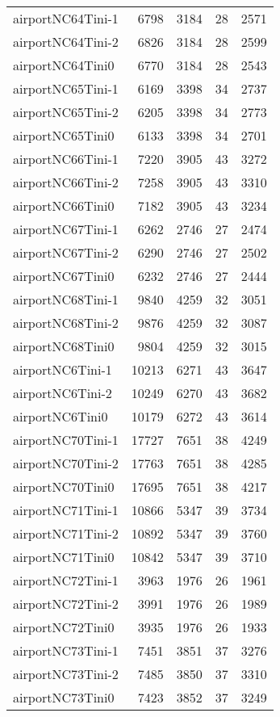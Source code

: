 \begin{longtable}{lrrrr}
airportNC64Tini-1 & 6798 & 3184 & 28 & 2571 \\
airportNC64Tini-2 & 6826 & 3184 & 28 & 2599 \\
airportNC64Tini0 & 6770 & 3184 & 28 & 2543 \\
airportNC65Tini-1 & 6169 & 3398 & 34 & 2737 \\
airportNC65Tini-2 & 6205 & 3398 & 34 & 2773 \\
airportNC65Tini0 & 6133 & 3398 & 34 & 2701 \\
airportNC66Tini-1 & 7220 & 3905 & 43 & 3272 \\
airportNC66Tini-2 & 7258 & 3905 & 43 & 3310 \\
airportNC66Tini0 & 7182 & 3905 & 43 & 3234 \\
airportNC67Tini-1 & 6262 & 2746 & 27 & 2474 \\
airportNC67Tini-2 & 6290 & 2746 & 27 & 2502 \\
airportNC67Tini0 & 6232 & 2746 & 27 & 2444 \\
airportNC68Tini-1 & 9840 & 4259 & 32 & 3051 \\
airportNC68Tini-2 & 9876 & 4259 & 32 & 3087 \\
airportNC68Tini0 & 9804 & 4259 & 32 & 3015 \\
airportNC6Tini-1 & 10213 & 6271 & 43 & 3647 \\
airportNC6Tini-2 & 10249 & 6270 & 43 & 3682 \\
airportNC6Tini0 & 10179 & 6272 & 43 & 3614 \\
airportNC70Tini-1 & 17727 & 7651 & 38 & 4249 \\
airportNC70Tini-2 & 17763 & 7651 & 38 & 4285 \\
airportNC70Tini0 & 17695 & 7651 & 38 & 4217 \\
airportNC71Tini-1 & 10866 & 5347 & 39 & 3734 \\
airportNC71Tini-2 & 10892 & 5347 & 39 & 3760 \\
airportNC71Tini0 & 10842 & 5347 & 39 & 3710 \\
airportNC72Tini-1 & 3963 & 1976 & 26 & 1961 \\
airportNC72Tini-2 & 3991 & 1976 & 26 & 1989 \\
airportNC72Tini0 & 3935 & 1976 & 26 & 1933 \\
airportNC73Tini-1 & 7451 & 3851 & 37 & 3276 \\
airportNC73Tini-2 & 7485 & 3850 & 37 & 3310 \\
airportNC73Tini0 & 7423 & 3852 & 37 & 3249 \\

\end{longtable}
